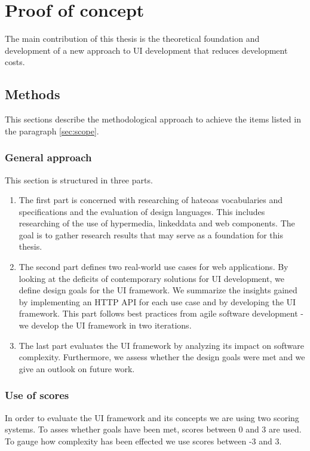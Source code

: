 \section{Proof of concept}
The main contribution of this thesis is the theoretical foundation and development of a new approach to UI development that reduces development costs.

\subsection{Methods}
This sections describe the methodological approach to achieve the items listed in the paragraph \ref{sec:scope}.

\subsubsection{General approach}
This section is structured in three parts.

\begin{enumerate}
\item The first part is concerned with researching of \gls{hateoas} vocabularies and specifications and the evaluation of design languages. This includes researching of the use of hypermedia, \gls{linkeddata} and web components. The goal is to gather research results that may serve as a foundation for this thesis.
\item The second part defines two real-world use cases for web applications. By looking at the deficits of contemporary solutions for UI development, we define design goals for the UI framework. We summarize the insights gained by implementing an HTTP API for each use case and by developing the UI framework. This part follows best practices from agile software development - we develop the UI framework in two iterations.
\item The last part evaluates the UI framework by analyzing its impact on software complexity. Furthermore, we assess whether the design goals were met and we give an outlook on future work.
\end{enumerate}

\subsubsection{Use of scores}
In order to evaluate the UI framework and its concepts we are using two scoring systems. To asses whether goals have been met, scores between 0 and 3 are used. To gauge how complexity has been effected we use scores between -3 and 3.


